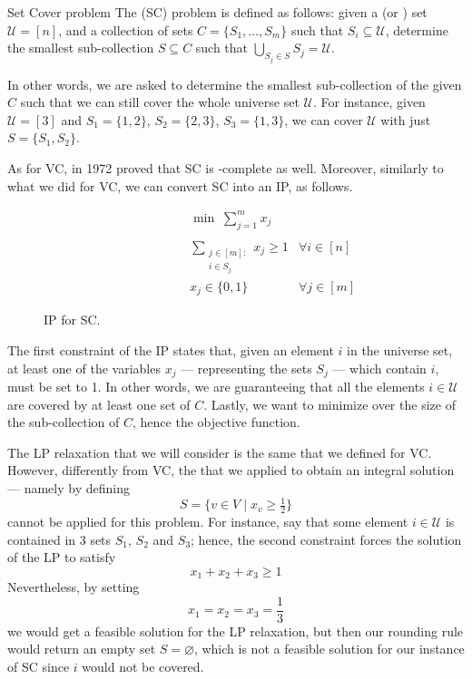 \documentclass[a4paper, 12pt]{report}
\begin{document}
    \begin{frameddefn}{Set Cover problem}
        The  (SC) problem is defined as follows: given a  (or ) set $\mathcal U = [n]$, and a collection of sets $C = \{S_1, \ldots, S_m\}$ such that $S_i \subseteq \mathcal U$, determine the smallest sub-collection $S \subseteq C$ such that $\bigcup_{S_j \in S}{S_j} = \mathcal U$.
    \end{frameddefn}

    In other words, we are asked to determine the smallest sub-collection of the given $C$ such that we can still cover the whole universe set $\mathcal U$. For instance, given $\mathcal U = [3]$ and $S_1 = \{1, 2\}$, $S_2 = \{2, 3\}$, $S_3 = \{1, 3\}$, we can cover $\mathcal U$ with just $S = \{S_1, S_2\}$.

    As for VC, in 1972 \cite{karp} proved that SC is \NPclass-complete as well. Moreover, similarly to what we did for VC, we can convert SC into an IP, as follows.

    \begin{figure}[H]
        \centering
        \[\begin{array}{ccl}
            \qquad\qquad\quad
            & \min \; \displaystyle \sum_{j = 1}^m {x_j} \\\\
            & \sum\limits_{\substack{j \in [m] : \\ i \in S_j}}{x_j} \ge 1 & \forall i \in [n] \\
            & x_j \in \{0, 1\} & \forall j \in [m]
        \end{array}\]
        \caption{IP for SC.}
    \end{figure}

    The first constraint of the IP states that, given an element $i$ in the universe set, at least one of the variables $x_j$ --- representing the sets $S_j$ --- which contain $i$, must be set to 1. In other words, we are guaranteeing that all the elements $i \in \mathcal U$ are covered by at least one set of $C$. Lastly, we want to minimize over the size of the sub-collection of $C$, hence the objective function.

    The LP relaxation that we will consider is the same that we defined for VC. However, differently from VC, the  that we applied to obtain an integral solution --- namely by defining $$S = \{v \in V \mid x_v \ge \tfrac{1}{2}\}$$ cannot be applied for this problem. For instance, say that some element $i \in \mathcal U$ is contained in 3 sets $S_1$, $S_2$ and $S_3$; hence, the second constraint forces the solution of the LP to satisfy $$x_1 + x_2 + x_3 \ge 1$$ Nevertheless, by setting $$x_1 = x_2 = x_3 = \dfrac{1}{3}$$ we would get a feasible solution for the LP relaxation, but then our rounding rule would return an empty set $S = \varnothing$, which is not a feasible solution for our instance of SC since $i$ would not be covered.
\end{document}
